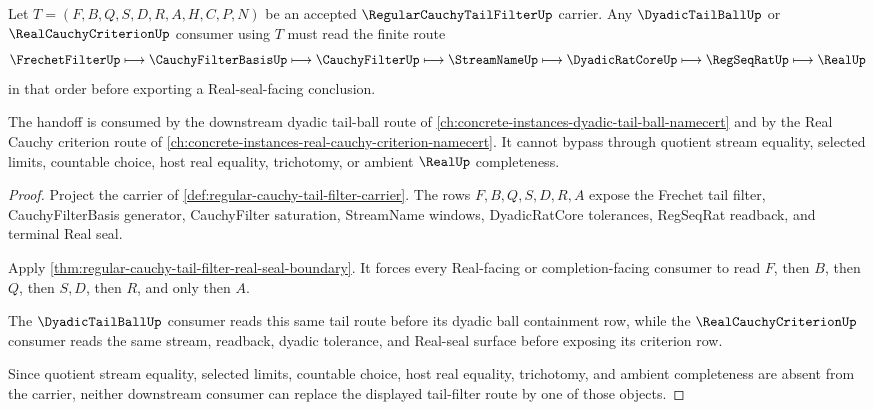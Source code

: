 \begin{theorem}
\label{thm:regular-cauchy-tail-filter-real-seal-handoff}
Let $T=(F,B,Q,S,D,R,A,H,C,P,N)$ be an accepted $\RegularCauchyTailFilterUp$ carrier. Any $\DyadicTailBallUp$ or $\RealCauchyCriterionUp$ consumer using $T$ must read the finite route
$$
\FrechetFilterUp \longmapsto \CauchyFilterBasisUp \longmapsto \CauchyFilterUp \longmapsto \StreamNameUp \longmapsto \DyadicRatCoreUp \longmapsto \RegSeqRatUp \longmapsto \RealUp
$$
in that order before exporting a Real-seal-facing conclusion.

The handoff is consumed by the downstream dyadic tail-ball route of \autoref{ch:concrete-instances-dyadic-tail-ball-namecert} and by the Real Cauchy criterion route of \autoref{ch:concrete-instances-real-cauchy-criterion-namecert}. It cannot bypass through quotient stream equality, selected limits, countable choice, host real equality, trichotomy, or ambient $\RealUp$ completeness.
\end{theorem}
\begin{proof}
Project the carrier of \autoref{def:regular-cauchy-tail-filter-carrier}. The rows $F,B,Q,S,D,R,A$ expose the Frechet tail filter, CauchyFilterBasis generator, CauchyFilter saturation, StreamName windows, DyadicRatCore tolerances, RegSeqRat readback, and terminal Real seal.

Apply \autoref{thm:regular-cauchy-tail-filter-real-seal-boundary}. It forces every Real-facing or completion-facing consumer to read $F$, then $B$, then $Q$, then $S,D$, then $R$, and only then $A$.

The $\DyadicTailBallUp$ consumer reads this same tail route before its dyadic ball containment row, while the $\RealCauchyCriterionUp$ consumer reads the same stream, readback, dyadic tolerance, and Real-seal surface before exposing its criterion row.

Since quotient stream equality, selected limits, countable choice, host real equality, trichotomy, and ambient completeness are absent from the carrier, neither downstream consumer can replace the displayed tail-filter route by one of those objects.
\end{proof}

